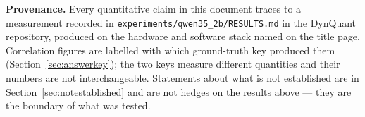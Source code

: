 \documentclass[11pt]{article}
\newcommand{\code}[1]{\texttt{#1}}
\begin{document}
\vspace{1.5em}
\noindent{\color{dqblue}\rule{\textwidth}{0.8pt}}
\vspace{0.6em}

\noindent\small
\textbf{Provenance.} Every quantitative claim in this document traces to a measurement recorded in
\code{experiments/}\allowbreak\code{qwen35\_2b/}\allowbreak\code{RESULTS.md} in the DynQuant
repository, produced on the hardware and software stack named on the title page. Correlation figures are labelled with which ground-truth
key produced them (Section~\ref{sec:answerkey}); the two keys measure different quantities and
their numbers are not interchangeable. Statements about what is not established are in
Section~\ref{sec:notestablished} and are not hedges on the results above --- they are the boundary
of what was tested.
\end{document}
